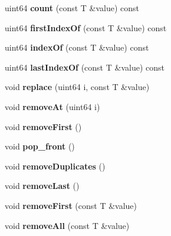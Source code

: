 \begin{DoxyCompactItemize}
uint64 {\bfseries count} (const T \&value) const
\item 
\mbox{\label{class_a_vector_aa8a2735af0f9799c1537d0536ca4f69f}} 
uint64 {\bfseries first\+Index\+Of} (const T \&value) const
\item 
\mbox{\label{class_a_vector_a81ee68969c55a70a2215e996e2d53027}} 
uint64 {\bfseries index\+Of} (const T \&value) const
\item 
\mbox{\label{class_a_vector_adcb1b4189e7e270ab8a22fa29ce109ae}} 
uint64 {\bfseries last\+Index\+Of} (const T \&value) const
\item 
\mbox{\label{class_a_vector_ae2ab95fcb42489ddfbf1bfa5a12867a8}} 
void {\bfseries replace} (uint64 i, const T \&value)
\item 
\mbox{\label{class_a_vector_ae3b650535e5a248a385988887064868e}} 
void {\bfseries remove\+At} (uint64 i)
\item 
\mbox{\label{class_a_vector_a020d395a9f706e2791a3c95f4766cfd8}} 
void {\bfseries remove\+First} ()
\item 
\mbox{\label{class_a_vector_aff3d2534c69c1402f85cda5b5c145356}} 
void {\bfseries pop\+\_\+front} ()
\item 
\mbox{\label{class_a_vector_aa0d05e2719478e74c93f54e8d7cffc6f}} 
void {\bfseries remove\+Duplicates} ()
\item 
\mbox{\label{class_a_vector_ad34deeefc2360e10c682d6b11831233a}} 
void {\bfseries remove\+Last} ()
\item 
\mbox{\label{class_a_vector_a33f1e98af680a5c9e430dc11beeb4dd8}} 
void {\bfseries remove\+First} (const T \&value)
\item 
\mbox{\label{class_a_vector_a521f435b2b3c74c92d6cbe94bc3faddd}} 
void {\bfseries remove\+All} (const T \&value)
\item 
\mbox{\label{class_a_vector_aa74f22a27358e4288ceb6bd0d1170490}} 

\end{DoxyCompactItemize}
